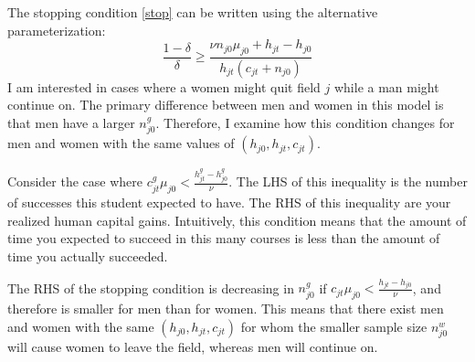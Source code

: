 \documentclass[10 pt]{article}
\begin{document}
\begin{outline}
\begin{blist}



\end{blist}



The stopping condition \eqref{stop} can be written using the alternative parameterization: 
\begin{equation*}
	\frac{1- \delta}{\delta} \geq 
	\frac{\nu n_{j0} \mu_{j0} + h_{jt} - h_{j0}}{h_{jt}(c_{jt} + n_{j0})} 
\end{equation*}
I am interested in cases where a women might quit field $j$ while a man might continue on. 
The primary difference between men and women in this model is that men have a larger $n_{j0}^g$. 
Therefore, I examine how this condition changes for men and women with the same values of $(h_{j0}, h_{jt}, c_{jt})$.

\begin{blist}

\item Consider the case where $c_{jt}^g \mu_{j0} < \frac{h_{jt}^g - h_{j0}^g}{\nu}$.
The LHS of this inequality is the number of successes this student expected to have. 
The RHS of this inequality are your realized human capital gains.
Intuitively, this condition means that the amount of time you expected to succeed in this many courses is less than the amount of time you actually succeeded. 

\item The RHS of the stopping condition is decreasing in $n_{j0}^g$ if $c_{jt} \mu_{j0} < \frac{h_{jt} - h_{j0}}{\nu}$, and therefore is smaller for men than for women. 
This means that there exist men and women with the same $(h_{j0}, h_{jt}, c_{jt})$ for whom the smaller sample size $n_{j0}^w$ will cause women to leave the field, whereas men will continue on. 

\end{blist}



\end{outline}
\end{document}
